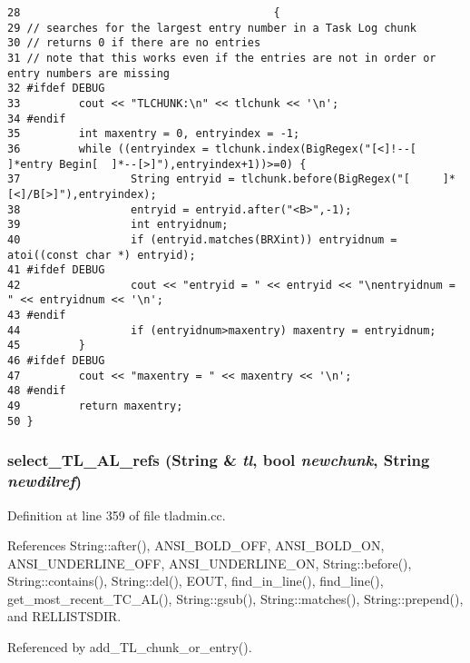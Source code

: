 \footnotesize\begin{verbatim}28                                       {
29 // searches for the largest entry number in a Task Log chunk
30 // returns 0 if there are no entries
31 // note that this works even if the entries are not in order or entry numbers are missing
32 #ifdef DEBUG
33         cout << "TLCHUNK:\n" << tlchunk << '\n';
34 #endif
35         int maxentry = 0, entryindex = -1;
36         while ((entryindex = tlchunk.index(BigRegex("[<]!--[    ]*entry Begin[  ]*--[>]"),entryindex+1))>=0) {
37                 String entryid = tlchunk.before(BigRegex("[     ]*[<]/B[>]"),entryindex);
38                 entryid = entryid.after("<B>",-1);
39                 int entryidnum;
40                 if (entryid.matches(BRXint)) entryidnum = atoi((const char *) entryid);
41 #ifdef DEBUG
42                 cout << "entryid = " << entryid << "\nentryidnum = " << entryidnum << '\n';
43 #endif
44                 if (entryidnum>maxentry) maxentry = entryidnum;
45         }
46 #ifdef DEBUG
47         cout << "maxentry = " << maxentry << '\n';
48 #endif
49         return maxentry;
50 }
\end{verbatim}\normalsize 
{}
\subsubsection{ select\_\-TL\_\-AL\_\-refs ({\bf String} \& {\em tl}, bool {\em newchunk}, {\bf String} {\em newdilref})}\label{tladmin_8cc_a8}




Definition at line 359 of file tladmin.cc.

References String::after(), ANSI\_\-BOLD\_\-OFF, ANSI\_\-BOLD\_\-ON, ANSI\_\-UNDERLINE\_\-OFF, ANSI\_\-UNDERLINE\_\-ON, String::before(), String::contains(), String::del(), EOUT, find\_\-in\_\-line(), find\_\-line(), get\_\-most\_\-recent\_\-TC\_\-AL(), String::gsub(), String::matches(), String::prepend(), and RELLISTSDIR.

Referenced by add\_\-TL\_\-chunk\_\-or\_\-entry().



